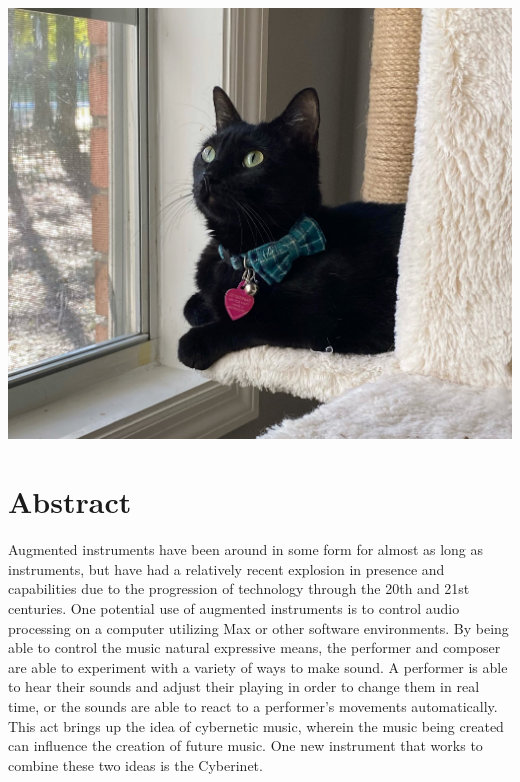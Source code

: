 \vspace{25mm}
\begin{center}
    \includegraphics[scale=0.2]{bean.jpeg}
\end{center}

\tableofcontents

 \listoffigures

\chapter{Abstract}


Augmented instruments have been around in some form for almost as long as instruments, but have had a relatively recent explosion in presence and capabilities due to the progression of technology through the 20th and 21st centuries. One potential use of augmented instruments is to control audio processing on a computer utilizing Max or other software environments. By being able to control the music natural expressive means, the performer and composer are able to experiment with a variety of ways to make sound. A performer is able to hear their sounds and adjust their playing in order to change them in real time, or the sounds are able to react to a performer's movements automatically. This act brings up the idea of cybernetic music, wherein the music being created can influence the creation of future music. One new instrument that works to combine these two ideas is the Cyberinet.

